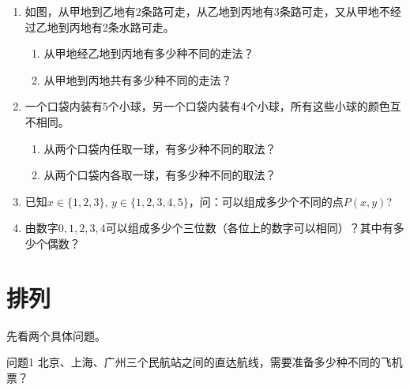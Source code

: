 \begin{enumerate}
\begin{center}
\end{center}  

    \item 如图，从甲地到乙地有2条路可走，从乙地到丙地有3条路可走，又从甲地不经过乙地到丙地有2条水路可走。
\begin{enumerate}[(1)]
    \item 从甲地经乙地到丙地有多少种不同的走法？
    \item 从甲地到丙地共有多少种不同的走法？
\end{enumerate}
    \item 一个口袋内装有5个小球，另一个口袋内装有4个小球，所有这些小球的颜色互不相同。
\begin{enumerate}[(1)]
    \item 从两个口袋内任取一球，有多少种不同的取法？
    \item 从两个口袋内各取一球，有多少种不同的取法？
\end{enumerate}

\item 已知$x\in\{1,2,3\}$, $y\in\{1,2,3,4,5\}$，问：可以组成多少个不同的点$P(x,y)$?

\item 由数字$0,1,2,3,4$可以组成多少个三位数（各位上的数字可以相同）？其中有多少个偶数？
\end{enumerate}
    

\section{排列}

先看两个具体问题。
\begin{thm}{问题1}
     北京、上海、广州三个民航站之间的直达航线，需要准备多少种不同的飞机票？
\end{thm}

